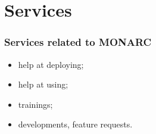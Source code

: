 %
%
\section*{Services}
\begin{frame}
    \frametitle{Services related to MONARC}
    \begin{center}
        \begin{itemize}
            \item help at deploying;
            \item help at using;
            \item trainings;
            \item developments, feature requests.
        \end{itemize}
    \end{center}
\end{frame} 
